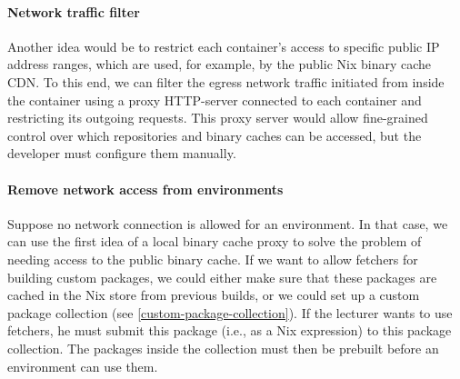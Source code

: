 \paragraph{Network traffic filter}
Another idea would be to restrict each container’s access to specific public IP address ranges, which are used, for example, by the public Nix binary cache CDN. To this end, we can filter the egress network traffic initiated from inside the container using a proxy HTTP-server connected to each container and restricting its outgoing requests. This proxy server would allow fine-grained control over which repositories and binary caches can be accessed, but the developer must configure them manually. 

\paragraph{Remove network access from environments}
Suppose no network connection is allowed for an environment. In that case, we can use the first idea of a local binary cache proxy to solve the problem of needing access to the public binary cache. If we want to allow fetchers for building custom packages, we could either make sure that these packages are cached in the Nix store from previous builds, or we could set up a custom package collection (see \ref{custom-package-collection}). If the lecturer wants to use fetchers, he must submit this package (i.e., as a Nix expression) to this package collection. The packages inside the collection must then be prebuilt before an environment can use them.